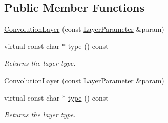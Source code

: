 \subsection*{Public Member Functions}
\begin{DoxyCompactItemize}
\item 
\mbox{\hyperlink{classcaffe_1_1_convolution_layer_ad27360afd7729001b9e4f1d8c8401866}{Convolution\+Layer}} (const \mbox{\hyperlink{classcaffe_1_1_layer_parameter}{Layer\+Parameter}} \&param)
\item 
\mbox{\label{classcaffe_1_1_convolution_layer_a43668ecdc0a579dd44fd9efbdfa076a9}} 
virtual const char $\ast$ \mbox{\hyperlink{classcaffe_1_1_convolution_layer_a43668ecdc0a579dd44fd9efbdfa076a9}{type}} () const
\begin{DoxyCompactList}\small\item\em Returns the layer type. \end{DoxyCompactList}\item 
\mbox{\hyperlink{classcaffe_1_1_convolution_layer_ad27360afd7729001b9e4f1d8c8401866}{Convolution\+Layer}} (const \mbox{\hyperlink{classcaffe_1_1_layer_parameter}{Layer\+Parameter}} \&param)
\item 
\mbox{\label{classcaffe_1_1_convolution_layer_a43668ecdc0a579dd44fd9efbdfa076a9}} 
virtual const char $\ast$ \mbox{\hyperlink{classcaffe_1_1_convolution_layer_a43668ecdc0a579dd44fd9efbdfa076a9}{type}} () const
\begin{DoxyCompactList}\small\item\em Returns the layer type. \end{DoxyCompactList}\end{DoxyCompactItemize}
